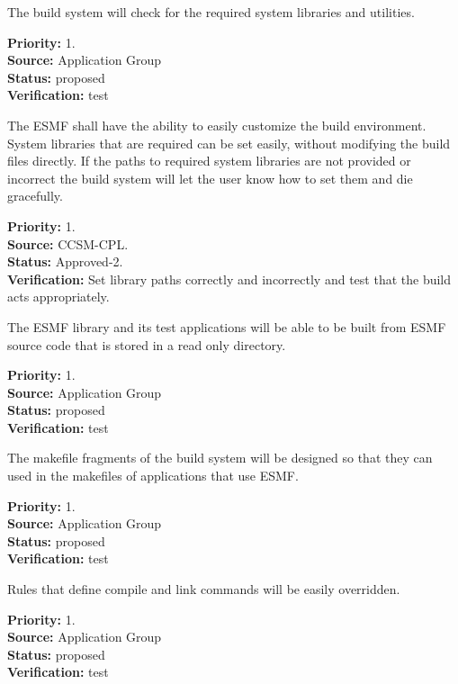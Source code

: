 The build system will check for the required system 
libraries and utilities.
\begin{reqlist}
{\bf Priority:} 1. \\
{\bf Source:} Application Group \\
{\bf Status:} proposed \\
{\bf Verification:} test
\end{reqlist}

The ESMF shall have the ability to easily customize the build environment. 
System libraries that are required can be set easily, without modifying 
the build files directly. If the paths to required system libraries 
are not provided or incorrect the build system will let the user know 
how to set them and die gracefully.
\begin{reqlist}
{\bf Priority:} 1. \\
{\bf Source:} CCSM-CPL. \\
{\bf Status:} Approved-2. \\
{\bf Verification:} Set library paths correctly and incorrectly and test that 
the build acts appropriately.
\end{reqlist}

The ESMF library and its test applications
will be able to be built from ESMF
source code that is stored in a
read only directory.

\begin{reqlist}
{\bf Priority:} 1. \\
{\bf Source:} Application Group \\
{\bf Status:} proposed \\
{\bf Verification:} test
\end{reqlist}

The makefile fragments of the build system will 
be designed so that they can used in the makefiles 
of applications that use ESMF.

\begin{reqlist}
{\bf Priority:} 1. \\
{\bf Source:} Application Group \\
{\bf Status:} proposed \\
{\bf Verification:} test
\end{reqlist}

Rules that define compile and link commands will be
easily overridden.

\begin{reqlist}
{\bf Priority:} 1. \\
{\bf Source:} Application Group \\
{\bf Status:} proposed \\
{\bf Verification:} test
\end{reqlist}


